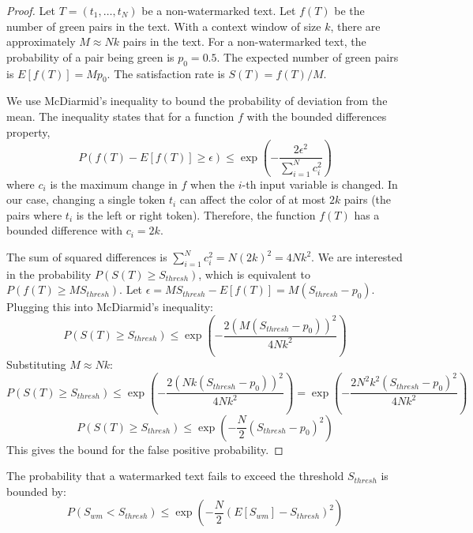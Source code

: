 \begin{proof}
Let $T = (t_1, \dots, t_N)$ be a non-watermarked text. Let $f(T)$ be the number of green pairs in the text. With a context window of size $k$, there are approximately $M \approx Nk$ pairs in the text. For a non-watermarked text, the probability of a pair being green is $p_0 = 0.5$. The expected number of green pairs is $E[f(T)] = M p_0$. The satisfaction rate is $S(T) = f(T)/M$.

We use McDiarmid's inequality to bound the probability of deviation from the mean. The inequality states that for a function $f$ with the bounded differences property,
$$P(f(T) - E[f(T)] \ge \epsilon) \le \exp\left( -\frac{2\epsilon^2}{\sum_{i=1}^N c_i^2} \right)$$
where $c_i$ is the maximum change in $f$ when the $i$-th input variable is changed. In our case, changing a single token $t_i$ can affect the color of at most $2k$ pairs (the pairs where $t_i$ is the left or right token). Therefore, the function $f(T)$ has a bounded difference with $c_i = 2k$.

The sum of squared differences is $\sum_{i=1}^N c_i^2 = N (2k)^2 = 4Nk^2$.
We are interested in the probability $P(S(T) \ge S_{thresh})$, which is equivalent to $P(f(T) \ge M S_{thresh})$.
Let $\epsilon = M S_{thresh} - E[f(T)] = M(S_{thresh} - p_0)$.
Plugging this into McDiarmid's inequality:
$$P(S(T) \ge S_{thresh}) \le \exp\left( -\frac{2(M(S_{thresh} - p_0))^2}{4Nk^2} \right)$$
Substituting $M \approx Nk$:
$$P(S(T) \ge S_{thresh}) \le \exp\left( -\frac{2(Nk(S_{thresh} - p_0))^2}{4Nk^2} \right) = \exp\left( -\frac{2N^2k^2(S_{thresh} - p_0)^2}{4Nk^2} \right)$$
$$P(S(T) \ge S_{thresh}) \le \exp\left( -\frac{N}{2}(S_{thresh} - p_0)^2 \right)$$
This gives the bound for the false positive probability.
\end{proof}

\begin{theorem}
The probability that a watermarked text fails to exceed the threshold $S_{thresh}$ is bounded by:
$$P(S_{wm} < S_{thresh}) \le \exp\left( -\frac{N}{2} (E[S_{wm}] - S_{thresh})^2 \right)$$
\end{theorem}

